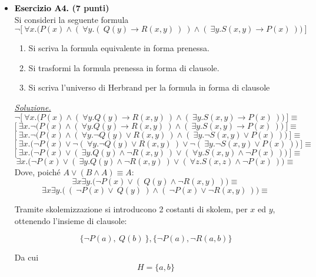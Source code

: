 \documentclass[a4paper,10pt]{article}
\begin{document}
{\begin{itemize}[label=, leftmargin=0pt]
    
    \item \textbf{\textcolor{black}{Esercizio A4.} (7 punti)} \\ 	
    Si consideri la seguente formula
    $$\lnot \bigg[\ \forall x.\bigg(P(x)\land (\ \forall y.(\ Q(y)\rightarrow R(x,y)\ ) \ )\land (\ \exists y. S(x,y)\rightarrow P(x)\ )\bigg)\ \bigg]$$
    \begin{enumerate}
        \item Si scriva la formula equivalente in forma prenessa.
        \item Si trasformi la formula prenessa in forma di clausole.
        \item Si scriva l'universo di Herbrand per la formula in forma di clausole
    \end{enumerate}

    \begin{osservazioni}
    \underline{\textit{Soluzione.}}
    $$\lnot \bigg[\ \forall x.\bigg(P(x)\land (\ \forall y.Q(y)\rightarrow R(x,y)\ ) \land (\ \exists y. S(x,y)\rightarrow P(x)\ )\bigg)\ \bigg]\equiv$$
    $$ \bigg[\ \exists x.\lnot\bigg(P(x)\land (\ \forall y.Q(y)\rightarrow R(x,y)\ ) \land (\ \exists y. S(x,y)\rightarrow P(x)\ )\bigg)\ \bigg]\equiv$$
    $$ \bigg[\ \exists x.\lnot\bigg(P(x)\land (\ \forall y.\lnot Q(y)\lor R(x,y)\ ) \land (\ \exists y. \lnot S(x,y)\lor P(x)\ )\bigg)\ \bigg]\equiv$$
    $$ \bigg[\ \exists x.\bigg(\lnot P(x)\lor \lnot(\ \forall y.\lnot Q(y)\lor R(x,y)\ ) \lor \lnot(\ \exists y. \lnot S(x,y)\lor P(x)\ )\bigg)\ \bigg]\equiv$$
    $$ \bigg[\ \exists x.\bigg(\lnot P(x)\lor (\ \exists y. Q(y)\land \lnot R(x,y)\ ) \lor (\ \forall y. S(x,y)\land \lnot P(x)\ )\bigg)\ \bigg]\equiv$$
    $$ \exists x.\bigg(\lnot P(x)\lor (\ \exists y. Q(y)\land \lnot R(x,y)\ ) \lor (\ \forall z. S(x,z)\land \lnot P(x)\ )\bigg)\equiv$$
    Dove, poiché $A \lor (B \land A) \equiv A$:
    $$ \exists x\exists y.\bigg(\lnot P(x)\lor (\ Q(y)\land \lnot R(x,y)\ ) \bigg)\equiv$$
    $$ \exists x\exists y.\bigg(\ (\ \lnot P(x)\lor\ Q(y)\ )\land (\ \lnot P(x) \lor \lnot R(x,y)\ ) \bigg)\equiv$$
    

    Tramite skolemizzazione si introducono 2 costanti di skolem, per $x$ ed $y$, ottenendo l'insieme di clausole:

    $$ \{\lnot P(a), \ Q(b)\ \}, \{ \lnot P(a), \lnot R(a,b)\}$$


    Da cui 
    $$H=\{a,b\}$$
    
    
    

\end{osservazioni}
\end{itemize}}
\end{document}
